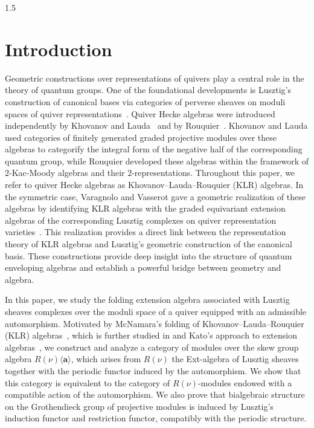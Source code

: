 \documentclass[10pt]{amsart}
\begin{document}
\setcounter{tocdepth}{2}\tableofcontents
\begin{spacing}{1.5}
\section{Introduction}
Geometric constructions over representations of quivers play a central role in the theory of quantum groups. One of the foundational developments is Lusztig's construction of canonical bases via categories of perverse sheaves on moduli spaces of quiver representations~\cite{lusztig1990canonical, lusztig2010introduction}. Quiver Hecke algebras were introduced independently by Khovanov and Lauda~\cite{KLR} and by Rouquier~\cite{rouquier20082kacmoodyalgebras,doi:10.1142/S1005386712000247}. Khovanov and Lauda used categories of finitely generated graded projective modules over these algebras to categorify the integral form of the negative half of the corresponding quantum group, while Rouquier developed these algebras within the framework of $2$-Kac-Moody algebras and their $2$-representations. Throughout this paper, we refer to quiver Hecke algebras as Khovanov--Lauda--Rouquier (KLR) algebras. In the symmetric case, Varagnolo and Vasserot gave a geometric realization of these algebras by identifying KLR algebras with the graded equivariant extension algebras of the corresponding Lusztig complexes on quiver representation varieties~\cite{VaragnoloVasserot+2011+67+100}. This realization provides a direct link between the representation theory of KLR algebras and Lusztig's geometric construction of the canonical basis. These constructions provide deep insight into the structure of quantum enveloping algebras and establish a powerful bridge between geometry and algebra.

In this paper, we study the folding extension algebra associated with Lusztig sheaves complexes over the moduli space of a quiver equipped with an admissible automorphism. Motivated by McNamara's folding of Khovanov--Lauda--Rouquier (KLR) algebras~\cite{https://doi.org/10.1112/jlms.12218}, which is further studied in \cite{MA202460} and Kato's approach to extension algebras~\cite{cd088214-009e-3813-9a86-97f9a299a24c}, we construct and analyze a category of modules over the skew group algebra $R(\nu)\langle\mathbf{a}\rangle$, which arises from $R(\nu)$ the Ext-algebra  of Lusztig sheaves together with the periodic functor induced by the automorphism. We show that this category is equivalent to the category of $R(\nu)$-modules endowed with a compatible action of the automorphism. We also prove that bialgebraic structure on the Grothendieck group of projective modules is induced by Lusztig's induction functor and restriction functor, compatibly with the periodic structure.


\end{spacing}
\end{document}
